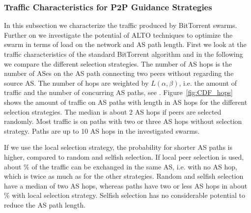 \subsubsection{Traffic Characteristics for P2P Guidance Strategies}
In this subsection we characterize the traffic produced by BitTorrent swarms. Further on we investigate the potential of ALTO techniques to optimize the swarm in terms of load on the network and AS path length.
First we look at the traffic characteristics of the standard BitTorrent algorithm and in the following we compare the different selection strategies.
The number of AS hops is the number of ASes on the AS path connecting two peers without regarding the source AS. The number of hops are weighted by $L(\alpha,\beta)$, i.e. the amount of traffic and the number of concurring AS paths, see . Figure~\ref{fig:CDF_hops} shows the amount of traffic on AS paths with length in AS hops for the different selection strategies. The median is about 2 AS hops if peers are selected randomly. Most traffic is on paths with two or three AS hops without selection strategy. Paths are up to 10 AS hops in the investigated swarms.




If we use the local selection strategy, the probability for shorter AS paths is higher, compared to random and selfish selection. If local peer selection is used, about \unit[20]{\%} of the traffic can be exchanged in the same AS, i.e. with no AS hop, which is twice as much as for the other strategies. Random and selfish selection have a median of two AS hops, whereas paths have two or less AS hops in about \unit[80]{\%} with local selection strategy. Selfish selection has no considerable potential to reduce the AS path length.

